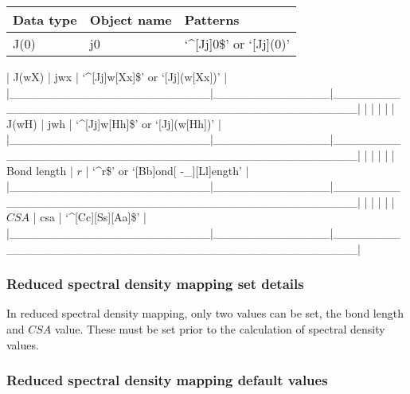 \begin{center}
\begin{tabular}{lll}
\toprule
Data type & Object name & Patterns \\
\midrule
 J(0)                    &  j0            &  `\^{}[Jj]0\$' or `[Jj](0)'                            \\
\bottomrule
\end{tabular}
\end{center}

| J(wX)                  | jwx          | `\^{}[Jj]w[Xx]\$' or `[Jj](w[Xx])'                   |
|\_\_\_\_\_\_\_\_\_\_\_\_\_\_\_\_\_\_\_\_\_\_\_\_|\_\_\_\_\_\_\_\_\_\_\_\_\_\_|\_\_\_\_\_\_\_\_\_\_\_\_\_\_\_\_\_\_\_\_\_\_\_\_\_\_\_\_\_\_\_\_\_\_\_\_\_\_\_\_\_\_\_\_\_\_\_\_\_\_|
|                        |              |                                                  |
| J(wH)                  | jwh          | `\^{}[Jj]w[Hh]\$' or `[Jj](w[Hh])'                   |
|\_\_\_\_\_\_\_\_\_\_\_\_\_\_\_\_\_\_\_\_\_\_\_\_|\_\_\_\_\_\_\_\_\_\_\_\_\_\_|\_\_\_\_\_\_\_\_\_\_\_\_\_\_\_\_\_\_\_\_\_\_\_\_\_\_\_\_\_\_\_\_\_\_\_\_\_\_\_\_\_\_\_\_\_\_\_\_\_\_|
|                        |              |                                                  |
| Bond length            | $r$            | `\^{}r\$' or `[Bb]ond[ -\_][Ll]ength'                 |
|\_\_\_\_\_\_\_\_\_\_\_\_\_\_\_\_\_\_\_\_\_\_\_\_|\_\_\_\_\_\_\_\_\_\_\_\_\_\_|\_\_\_\_\_\_\_\_\_\_\_\_\_\_\_\_\_\_\_\_\_\_\_\_\_\_\_\_\_\_\_\_\_\_\_\_\_\_\_\_\_\_\_\_\_\_\_\_\_\_|
|                        |              |                                                  |
| $CSA$                    | csa          | `\^{}[Cc][Ss][Aa]\$'                                 |
|\_\_\_\_\_\_\_\_\_\_\_\_\_\_\_\_\_\_\_\_\_\_\_\_|\_\_\_\_\_\_\_\_\_\_\_\_\_\_|\_\_\_\_\_\_\_\_\_\_\_\_\_\_\_\_\_\_\_\_\_\_\_\_\_\_\_\_\_\_\_\_\_\_\_\_\_\_\_\_\_\_\_\_\_\_\_\_\_\_|



\subsubsection{Reduced spectral density mapping set details}

In reduced spectral density mapping, only two values can be set, the bond length and $CSA$
value.  These must be set prior to the calculation of spectral density values.



\subsubsection{Reduced spectral density mapping default values}



